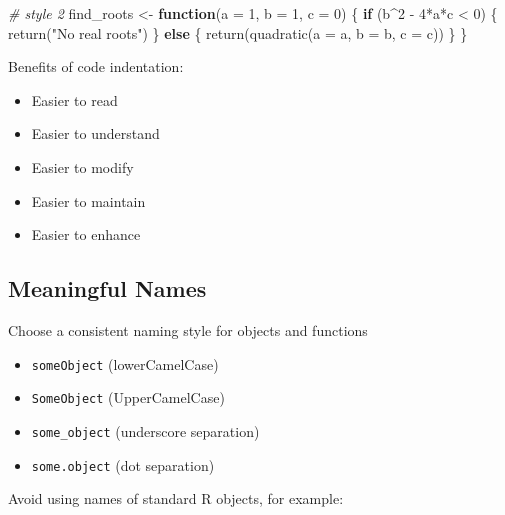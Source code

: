 \documentclass[
]{book}
\newenvironment{Shaded}{\begin{snugshade}}{\end{snugshade}}
\newcommand{\AttributeTok}[1]{\textcolor[rgb]{0.77,0.63,0.00}{#1}}
\newcommand{\CommentTok}[1]{\textcolor[rgb]{0.56,0.35,0.01}{\textit{#1}}}
\newcommand{\ControlFlowTok}[1]{\textcolor[rgb]{0.13,0.29,0.53}{\textbf{#1}}}
\newcommand{\DecValTok}[1]{\textcolor[rgb]{0.00,0.00,0.81}{#1}}
\newcommand{\FunctionTok}[1]{\textcolor[rgb]{0.00,0.00,0.00}{#1}}
\newcommand{\NormalTok}[1]{#1}
\newcommand{\OtherTok}[1]{\textcolor[rgb]{0.56,0.35,0.01}{#1}}
\newcommand{\SpecialCharTok}[1]{\textcolor[rgb]{0.00,0.00,0.00}{#1}}
\newcommand{\StringTok}[1]{\textcolor[rgb]{0.31,0.60,0.02}{#1}}
\providecommand{\tightlist}{%
  \setlength{\itemsep}{0pt}\setlength{\parskip}{0pt}}
\begin{document}
\begin{Shaded}
\begin{Highlighting}[]
\CommentTok{\# style 2}
\NormalTok{find\_roots }\OtherTok{\textless{}{-}} \ControlFlowTok{function}\NormalTok{(}\AttributeTok{a =} \DecValTok{1}\NormalTok{, }\AttributeTok{b =} \DecValTok{1}\NormalTok{, }\AttributeTok{c =} \DecValTok{0}\NormalTok{) \{}
  \ControlFlowTok{if}\NormalTok{ (b}\SpecialCharTok{\^{}}\DecValTok{2} \SpecialCharTok{{-}} \DecValTok{4}\SpecialCharTok{*}\NormalTok{a}\SpecialCharTok{*}\NormalTok{c }\SpecialCharTok{\textless{}} \DecValTok{0}\NormalTok{) \{}
    \FunctionTok{return}\NormalTok{(}\StringTok{"No real roots"}\NormalTok{)}
\NormalTok{  \} }\ControlFlowTok{else}\NormalTok{ \{}
    \FunctionTok{return}\NormalTok{(}\FunctionTok{quadratic}\NormalTok{(}\AttributeTok{a =}\NormalTok{ a, }\AttributeTok{b =}\NormalTok{ b, }\AttributeTok{c =}\NormalTok{ c))}
\NormalTok{  \}}
\NormalTok{\}}
\end{Highlighting}
\end{Shaded}

Benefits of code indentation:

\begin{itemize}
\tightlist
\item
  Easier to read
\item
  Easier to understand
\item
  Easier to modify
\item
  Easier to maintain
\item
  Easier to enhance
\end{itemize}

\hypertarget{meaningful-names}{%
\subsection{Meaningful Names}\label{meaningful-names}}

Choose a consistent naming style for objects and functions

\begin{itemize}
\tightlist
\item
  \texttt{someObject} (lowerCamelCase)
\item
  \texttt{SomeObject} (UpperCamelCase)
\item
  \texttt{some\_object} (underscore separation)
\item
  \texttt{some.object} (dot separation)
\end{itemize}

Avoid using names of standard R objects, for example:
\end{document}
